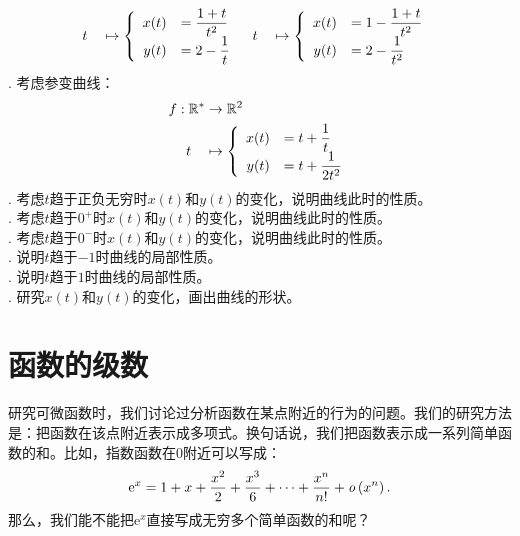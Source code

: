 \documentclass[12pt,UTF8]{ctexbook}
\begin{document}
\begin{xt}
\begin{align*}
        \;\;t\quad &\mapsto\left\{
            \begin{array}[]{rl}
                x(t) &\displaystyle = \frac{1+t}{t^2} \\
                y(t) &\displaystyle = 2 - \frac{1}{t} \\
            \end{array}
        \right.
        & 
        t\quad &\mapsto\left\{
            \begin{array}[]{rl}
                x(t) &\displaystyle = 1 - \frac{1+t}{t^2} \\
                y(t) &\displaystyle = 2 - \frac{1}{t^2} \\
            \end{array}
        \right.
    \end{align*}
    . 考虑参变曲线：
    \begin{align*}
        f: \mathbb{R}^* &\rightarrow \mathbb{R}^2 \\
        t\quad &\mapsto\left\{
            \begin{array}[]{rl}
                x(t) &\displaystyle = t + \frac{1}{t} \\
                y(t) &\displaystyle = t + \frac{1}{2t^2} \\
            \end{array}
        \right.
    \end{align*}
    . 考虑$t$趋于正负无穷时$x(t)$和$y(t)$的变化，说明曲线此时的性质。\\
    . 考虑$t$趋于$0^+$时$x(t)$和$y(t)$的变化，说明曲线此时的性质。\\
    . 考虑$t$趋于$0^-$时$x(t)$和$y(t)$的变化，说明曲线此时的性质。\\
    . 说明$t$趋于$-1$时曲线的局部性质。\\
    . 说明$t$趋于$1$时曲线的局部性质。\\
    . 研究$x(t)$和$y(t)$的变化，画出曲线的形状。
\end{xt}

\chapter{函数的级数}

研究可微函数时，我们讨论过分析函数在某点附近的行为的问题。我们的研究方法是：把函数在该点附近表示成多项式。换句话说，我们把函数表示成一系列简单函数的和。比如，指数函数在$0$附近可以写成：
$$\mathrm{e}^x = 1 + x + \frac{x^2}{2} + \frac{x^3}{6} + \cdots + \frac{x^n}{n!} + \mathit{o}\left(x^n\right).$$
那么，我们能不能把$\mathrm{e}^x$直接写成无穷多个简单函数的和呢？
\end{document}
